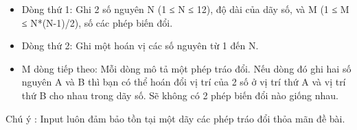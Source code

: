 \begin{itemize}
	\item     Dòng thứ 1: Ghi 2 số nguyên N (1 ≤ N ≤ 12), độ dài của dãy số, và M (1 ≤ M ≤ N*(N-1)/2), số các phép biến đổi.   
\end{itemize}
\begin{itemize}
	\item     Dòng thứ 2: Ghi một hoán vị các số nguyên từ 1 đến N.   
	\item     M dòng tiếp theo: Mỗi dòng mô tả một phép tráo đổi. Nếu dòng đó ghi hai số nguyên A và B thì bạn có thể hoán đổi vị trí của 2 số ở vị trí thứ A và vị trí thứ B cho nhau trong dãy số. Sẽ không có 2 phép biến đổi nào giống nhau.   
\end{itemize}

Chú ý   : Input luôn đảm bảo tồn tại một dãy các phép tráo đổi thỏa mãn đề bài.